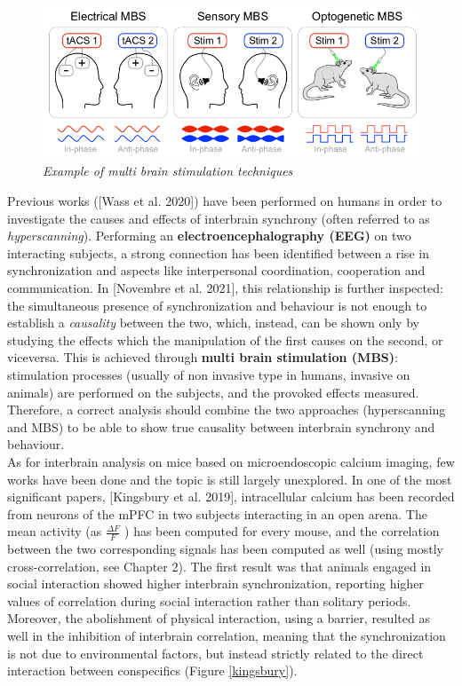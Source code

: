 \documentclass[12pt, a4paper]{article}
\begin{document}
\begin{figure}[H]
	\begin{center}
		\includegraphics[scale=.65]{novembre.png} 
	\end{center} 
	\caption{\textit{Example of multi brain stimulation techniques}} \label{mbs}
	
\end{figure}
Previous works ([Wass et al. 2020]) have been performed on humans in order to investigate the causes and effects of interbrain synchrony (often referred to as \textit{hyperscanning}). Performing an \textbf{electroencephalography (EEG)} on two interacting subjects, a strong connection has been identified between a rise in synchronization  and aspects like interpersonal coordination, cooperation and communication. In [Novembre et al. 2021], this relationship is further inspected: the simultaneous presence of synchronization and behaviour is not enough to establish a \textit{causality} between the two, which, instead, can be shown only by studying the effects which the manipulation of the first causes on the second, or viceversa. This is achieved through \textbf{multi brain stimulation (MBS)}: stimulation processes (usually of non invasive type in humans, invasive on animals) are performed on the subjects, and the provoked effects measured. Therefore, a correct analysis should combine the two approaches (hyperscanning and MBS) to be able to show true causality between interbrain synchrony and behaviour.
\\

As for interbrain analysis on mice based on microendoscopic calcium imaging, few works have been done and the topic is still largely unexplored. In one of the most significant papers, [Kingsbury et al. 2019], intracellular calcium has been recorded from neurons of the mPFC in two subjects interacting in an open arena.  The mean activity (as $\frac{\Delta F }{F}$ ) has been computed for every mouse, and the correlation between the two corresponding signals has been computed as well (using mostly cross-correlation, see Chapter 2). The first result was that animals engaged in social interaction showed higher interbrain synchronization, reporting higher values of correlation during social interaction rather than solitary periods. Moreover, the abolishment of physical interaction, using a barrier, resulted as well in the inhibition of interbrain correlation, meaning that the synchronization is not due to environmental factors, but instead strictly related to the direct interaction between conspecifics (Figure \ref{kingsbury}).\\
\end{document}
